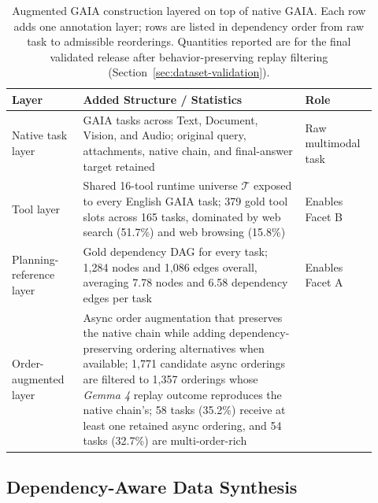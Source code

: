 \documentclass{article}
\providecommand{\model}[1]{\emph{#1}}
\begin{document}
\begin{table}[t]
\centering

\scriptsize
\setlength{\tabcolsep}{4pt}
\begin{tabularx}{\linewidth}{@{}>{\raggedright\arraybackslash}p{0.18\linewidth}>{\raggedright\arraybackslash}p{0.56\linewidth}>{\raggedright\arraybackslash}p{0.18\linewidth}@{}}
\toprule
Layer & Added Structure / Statistics & Role \\
\midrule
Native task layer & 165 GAIA tasks across Text, Document, Vision, and Audio; original query, attachments, native chain, and final-answer target retained & Raw multimodal task\\
Tool layer & Shared 16-tool runtime universe $\mathcal{T}$ exposed to every English GAIA task; 379 gold tool slots across 165 tasks, dominated by web search (51.7\%) and web browsing (15.8\%) & Enables Facet B \\
Planning-reference layer & Gold dependency DAG for every task; 1{,}284 nodes and 1{,}086 edges overall, averaging 7.78 nodes and 6.58 dependency edges per task & Enables Facet A \\
Order-augmented layer & Async order augmentation that preserves the native chain while adding dependency-preserving ordering alternatives when available; 1{,}771 candidate async orderings are filtered to 1{,}357 orderings whose \model{Gemma 4} replay outcome reproduces the native chain's; 58 tasks (35.2\%) receive at least one retained async ordering, and 54 tasks (32.7\%) are multi-order-rich \\

\bottomrule
\end{tabularx}
\vspace{-0.1cm}
\caption{Augmented GAIA construction layered on top of native GAIA. Each row adds one annotation layer; rows are listed in dependency order from raw task to admissible reorderings. Quantities reported are for the final validated release after behavior-preserving replay filtering (Section~\ref{sec:dataset-validation}).}
\label{tab:gaia-dataset-stats}
\end{table}

\subsection{Dependency-Aware Data Synthesis}
\label{subsec:data-synthesis}
\end{document}
